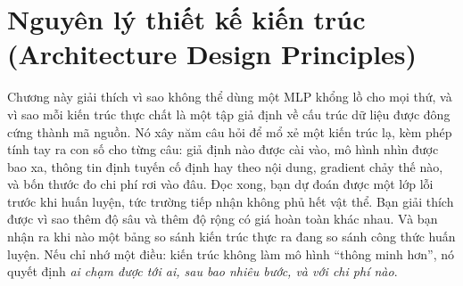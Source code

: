 \documentclass[../../deep_learning.tex]{subfiles}
\begin{document}
\chapter{Nguyên lý thiết kế kiến trúc (Architecture Design Principles)}

\begin{tomtat}
Chương này giải thích vì sao không thể dùng một MLP khổng lồ cho mọi thứ, và vì sao mỗi kiến trúc thực chất là một tập giả định về cấu trúc dữ liệu được đông cứng thành mã nguồn. Nó xây năm câu hỏi để mổ xẻ một kiến trúc lạ, kèm phép tính tay ra con số cho từng câu: giả định nào được cài vào, mô hình nhìn được bao xa, thông tin định tuyến cố định hay theo nội dung, gradient chảy thế nào, và bốn thước đo chi phí rơi vào đâu. Đọc xong, bạn dự đoán được một lớp lỗi trước khi huấn luyện, tức trường tiếp nhận không phủ hết vật thể. Bạn giải thích được vì sao thêm độ sâu và thêm độ rộng có giá hoàn toàn khác nhau. Và bạn nhận ra khi nào một bảng so sánh kiến trúc thực ra đang so sánh công thức huấn luyện. Nếu chỉ nhớ một điều: kiến trúc không làm mô hình ``thông minh hơn'', nó quyết định \emph{ai chạm được tới ai, sau bao nhiêu bước, và với chi phí nào}.
\end{tomtat}
\end{document}
